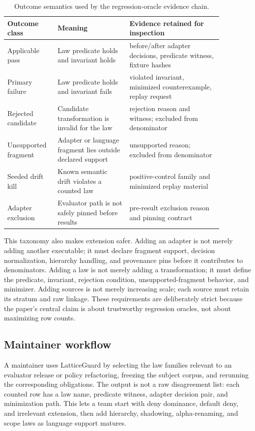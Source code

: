\documentclass[10pt,conference]{IEEEtran}
\begin{document}
\begin{table}[t]
\centering
\caption{Outcome semantics used by the regression-oracle evidence chain.}
\label{tab:triage}
\begin{tabular}{p{0.18\linewidth}p{0.30\linewidth}p{0.39\linewidth}}
\toprule
Outcome class & Meaning & Evidence retained for inspection \\
\midrule
Applicable pass & Law predicate holds and invariant holds & before/after adapter decisions, predicate witness, fixture hashes \\
Primary failure & Law predicate holds and invariant fails & violated invariant, minimized counterexample, replay request \\
Rejected candidate & Candidate transformation is invalid for the law & rejection reason and witness; excluded from denominator \\
Unsupported fragment & Adapter or language fragment lies outside declared support & unsupported reason; excluded from denominator \\
Seeded drift kill & Known semantic drift violates a counted law & positive-control family and minimized replay material \\
Adapter exclusion & Evaluator path is not safely pinned before results & pre-result exclusion reason and pinning contract \\
\bottomrule
\end{tabular}
\end{table}

This taxonomy also makes extension safer.  Adding an adapter is not merely adding another executable; it must declare fragment support, decision normalization, hierarchy handling, and provenance pins before it contributes to denominators.  Adding a law is not merely adding a transformation; it must define the predicate, invariant, rejection condition, unsupported-fragment behavior, and minimizer.  Adding sources is not merely increasing scale; each source must retain its stratum and raw linkage.  These requirements are deliberately strict because the paper's central claim is about trustworthy regression oracles, not about maximizing row counts.

\subsection{Maintainer workflow}
A maintainer uses LatticeGuard by selecting the law families relevant to an evaluator release or policy refactoring, freezing the subject corpus, and rerunning the corresponding obligations.  The output is not a raw disagreement list: each counted row has a law name, predicate witness, adapter decision pair, and minimization path.  This lets a team start with deny dominance, default deny, and irrelevant extension, then add hierarchy, shadowing, alpha-renaming, and scope laws as language support matures.
\end{document}

